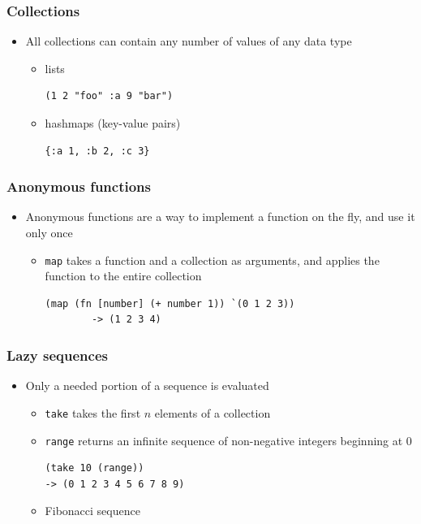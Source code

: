 \documentclass{beamer}
\begin{document}
\begin{frame}[fragile]
\frametitle{Collections}
    \begin{itemize}
        \item All collections can contain any number of values of any data type
	    \begin{itemize}
	      \item lists
	      \begin{verbatim}(1 2 "foo" :a 9 "bar")
	      \end{verbatim}
	      \item hashmaps (key-value pairs)
	      \begin{verbatim}{:a 1, :b 2, :c 3}
	      \end{verbatim}
	    \end{itemize}
    \end{itemize}
\end{frame}

\begin{frame}[fragile]
\frametitle{Anonymous functions}
	\begin{itemize}
  	  \item Anonymous functions are a way to implement a function on the fly, and use it only once
  	  \begin{itemize}
  	 	\item \texttt{map} takes a function and a collection as arguments, and applies the function to the entire collection
		\begin{verbatim}(map (fn [number] (+ number 1)) `(0 1 2 3))
		-> (1 2 3 4)
		\end{verbatim}
	\end{itemize}
   \end{itemize}
\end{frame}

\begin{frame}[fragile]
\frametitle{Lazy sequences}
	\begin{itemize}
  	  \item Only a needed portion of a sequence is evaluated
  	  \begin{itemize}
  	  	\item \texttt{take} takes the first $n$ elements of a collection
  	  	\item \texttt{range} returns an infinite sequence of non-negative integers beginning at 0 	  	
  	  	\begin{verbatim}(take 10 (range))
-> (0 1 2 3 4 5 6 7 8 9)
  	  	\end{verbatim}
  	  	\item Fibonacci sequence
  	  \end{itemize}
  \end{itemize}
\end{frame}
\end{document}
